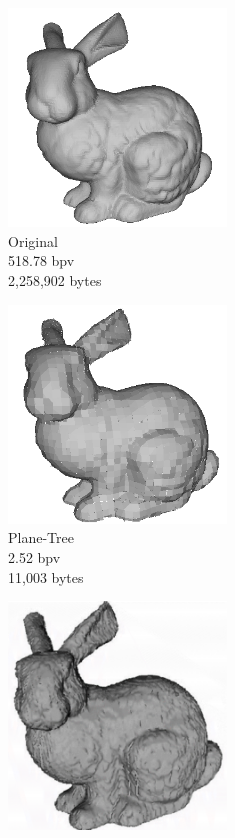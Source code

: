\begin{figure}[H] 
        \begin{center}
 		\begin{subfigure}[b]{6cm}
 			   \centering
 			   \includegraphics[width=5.8cm]{images/experiments/pt_qual/original1}
 			   \captionsetup{justification=centering}
                \caption{Original\\518.78 bpv\\2,258,902 bytes}
                \label{fig:PT_SOTAQ1_ORIG}
        \end{subfigure}%
        \begin{subfigure}[b]{6cm}
                \includegraphics[width=5.8cm]{images/experiments/pt_qual/pt_11004}
                \captionsetup{justification=centering}
                \caption{Plane-Tree\\2.52 bpv\\11,003 bytes}
                \label{fig:PT_SOTAQ1_PLT}
        \end{subfigure}
        \begin{subfigure}[b]{6cm}
                \includegraphics[width=5.8cm]{images/experiments/pt_qual/tg}

\end{subfigure}
\end{center}
\end{figure}

